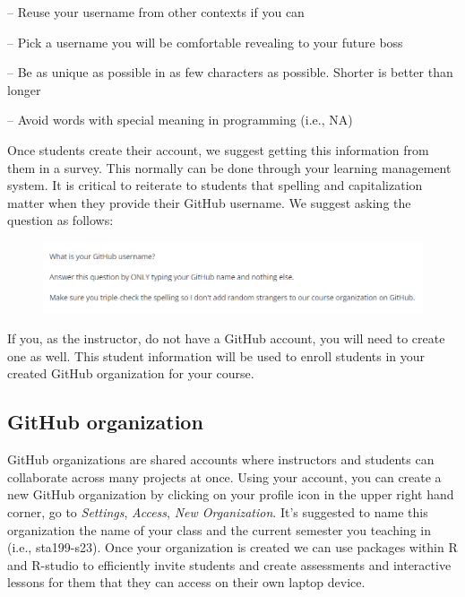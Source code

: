 \documentclass[
  12pt]{article}
\begin{document}
-- Reuse your username from other contexts if you can

-- Pick a username you will be comfortable revealing to your future boss

-- Be as unique as possible in as few characters as possible. Shorter is
better than longer

-- Avoid words with special meaning in programming (i.e., NA)

Once students create their account, we suggest getting this information
from them in a survey. This normally can be done through your learning
management system. It is critical to reiterate to students that spelling
and capitalization matter when they provide their GitHub username. We
suggest asking the question as follows:

\begin{figure}

{\centering \includegraphics{images/github.question.png}

}

\end{figure}

If you, as the instructor, do not have a GitHub account, you will need
to create one as well. This student information will be used to enroll
students in your created GitHub organization for your course.

\hypertarget{github-organization}{%
\subsection{GitHub organization}\label{github-organization}}

GitHub organizations are shared accounts where instructors and students
can collaborate across many projects at once. Using your account, you
can create a new GitHub organization by clicking on your profile icon in
the upper right hand corner, go to \emph{Settings}, \emph{Access},
\emph{New Organization}. It's suggested to name this organization the
name of your class and the current semester you teaching in (i.e.,
sta199-s23). Once your organization is created we can use packages
within R and R-studio to efficiently invite students and create
assessments and interactive lessons for them that they can access on
their own laptop device.
\end{document}
